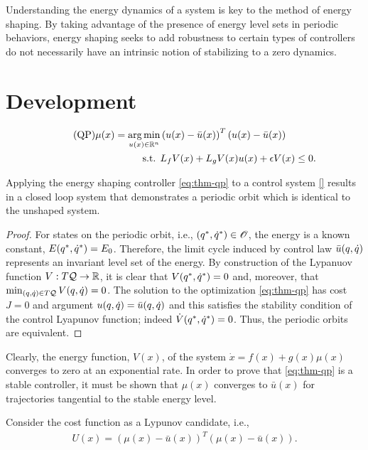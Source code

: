 Understanding the energy dynamics of a system is key to the method of energy shaping.
%
By taking advantage of the presence of energy level sets in periodic behaviors, energy shaping seeks to add robustness to certain types of controllers do not necessarily have an intrinsic notion of stabilizing to a zero dynamics.
%


\section{Development}

\begin{align}
  \label{eq:thm-qp} \tag {QP}
  \mu(x) = \operatorname*{arg\,min}_{u(x) \in \mathbb{R}^{n}} & \left(u(x) - {\bar u}(x)\right)^T \left(u(x) - {\bar u}(x) \right)\\
  \nonumber
  \mbox{s.t. } & L_{f} V(x) + L_{g} V(x) u(x) + \epsilon V(x) \leq 0.
\end{align}

\begin{lemma}
  Applying the energy shaping controller \eqref{eq:thm-qp} to a control system \eqref{} results in a closed loop system that demonstrates a periodic orbit which is identical to the unshaped system.
\end{lemma}

\begin{proof}
  For states on the periodic orbit, i.e., $(q^{*}, \dot{q}^{*}) \in \mathscr{O}$, the energy is a known constant, $E(q^{*}, \dot{q}^{*}) = E_{0}$.
%
  Therefore, the limit cycle induced by control law ${\bar u}(q, \dot{q})$ represents an invariant level set of the energy.
%
  By construction of the Lypanuov function $V : T\mathcal{Q} \to \mathbb{R}$, it is clear that $V(q^{*}, \dot{q}^{*}) = 0$ and, moreover, that $\min_{(q, \dot{q}) \in T\mathcal{Q}} V(q, \dot{q}) = 0$.
%
  The solution to the optimization \eqref{eq:thm-qp} has cost $J = 0$ and argument $u(q, \dot{q}) = {\bar u}(q, \dot{q})$ and this satisfies the stability condition of the control Lyapunov function; indeed ${\dot V}(q^{*}, \dot{q}^{*}) = 0$.
%
  Thus, the periodic orbits are equivalent.
\end{proof}


Clearly, the energy function, $V(x)$, of the system ${\dot x} = f(x) + g(x) \mu(x)$ converges to zero at an exponential rate.
%
In order to prove that \eqref{eq:thm-qp} is a stable controller, it must be shown that $\mu(x)$ converges to ${\bar u}(x)$ for trajectories tangential to the stable energy level.

Consider the cost function as a Lypunov candidate, i.e.,
\begin{align}
  U(x) = \left(\mu(x) - {\bar u}(x)\right)^T \left(\mu(x) - {\bar u}(x) \right).
\end{align}

